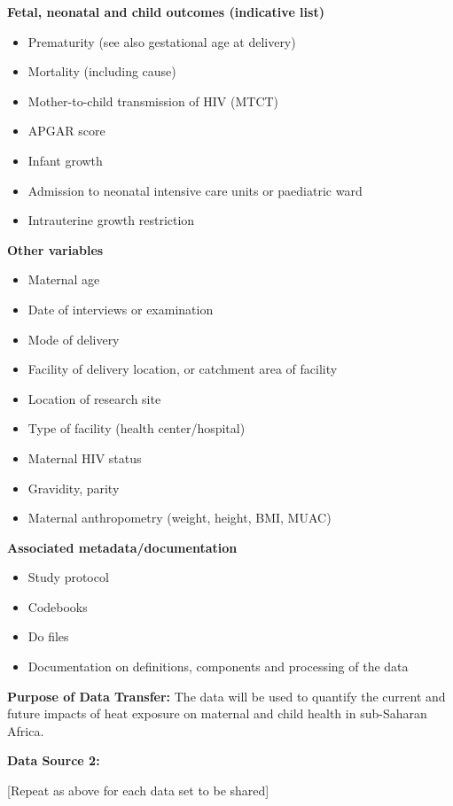 \documentclass[12pt,letterpaper]{article}
\begin{document}
\textbf{Fetal, neonatal and child outcomes (indicative list)}
\begin{itemize}
    \item Prematurity (see also gestational age at delivery)
    \item Mortality (including cause)
    \item Mother-to-child transmission of HIV (MTCT)
    \item APGAR score
    \item Infant growth
    \item Admission to neonatal intensive care units or paediatric ward
    \item Intrauterine growth restriction
\end{itemize}

\textbf{Other variables}
\begin{itemize}
    \item Maternal age
    \item Date of interviews or examination
    \item Mode of delivery
    \item Facility of delivery location, or catchment area of facility
    \item Location of research site
    \item Type of facility (health center/hospital)
    \item Maternal HIV status
    \item Gravidity, parity
    \item Maternal anthropometry (weight, height, BMI, MUAC)
\end{itemize}

\textbf{Associated metadata/documentation}
\begin{itemize}
    \item Study protocol
    \item Codebooks
    \item Do files
    \item Documentation on definitions, components and processing of the data
\end{itemize}

\textbf{Purpose of Data Transfer:} The data will be used to quantify the current and future impacts of heat exposure on maternal and child health in sub-Saharan Africa.

\textbf{Data Source 2:}

[Repeat as above for each data set to be shared]

\newpage
\end{document}

